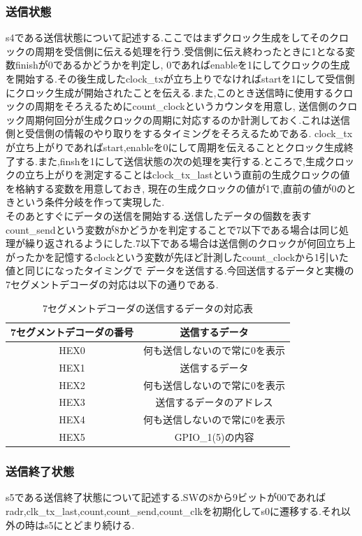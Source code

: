 \documentclass[dvipdfmx]{jarticle}
\begin{document}
\subsubsection{送信状態}
s4である送信状態について記述する.ここではまずクロック生成をしてそのクロックの周期を受信側に伝える処理を行う.受信側に伝え終わったときに1となる変数finishが0であるかどうかを判定し,
0であればenableを1にしてクロックの生成を開始する.その後生成したclock\_txが立ち上りでなければstartを1にして受信側にクロック生成が開始されたことを伝える.また,このとき送信時に使用するクロックの周期をそろえるためにcount\_clockというカウンタを用意し,
送信側のクロック周期何回分が生成クロックの周期に対応するのか計測しておく.これは送信側と受信側の情報のやり取りをするタイミングをそろえるためである.
clock\_txが立ち上がりであればstart,enableを0にして周期を伝えることとクロック生成終了する.また,finshを1にして送信状態の次の処理を実行する.ところで,生成クロックの立ち上がりを測定することはclock\_tx\_lastという直前の生成クロックの値を格納する変数を用意しておき,
現在の生成クロックの値が1で,直前の値が0のときという条件分岐を作って実現した.
\\そのあとすぐにデータの送信を開始する.送信したデータの個数を表すcount\_sendという変数が8かどうかを判定することで7以下である場合は同じ処理が繰り返されるようにした.7以下である場合は送信側のクロックが何回立ち上がったかを記憶するclockという変数が先ほど計測したcount\_clockから1引いた値と同じになったタイミングで
データを送信する.今回送信するデータと実機の7セグメントデコーダの対応は以下の通りである.
\clearpage
\begin{table}[h]
  \centering
  \begin{tabular}{|c|c|}
    \hline
    7セグメントデコーダの番号 & 送信するデータ\\
    \hline\hline
    HEX0 & 何も送信しないので常に0を表示\\\hline
    HEX1 & 送信するデータ\\\hline
    HEX2 & 何も送信しないので常に0を表示\\\hline
    HEX3 & 送信するデータのアドレス\\\hline
    HEX4 & 何も送信しないので常に0を表示\\\hline
    HEX5 & GPIO\_1(5)の内容 \\\hline
    \hline
  \end{tabular}
  \caption{7セグメントデコーダの送信するデータの対応表}
\end{table}
\subsubsection{送信終了状態}
s5である送信終了状態について記述する.SWの8から9ビットが00であればradr,clk\_tx\_last,count,count\_send,count\_clkを初期化してs0に遷移する.それ以外の時はs5にとどまり続ける.
\end{document}
